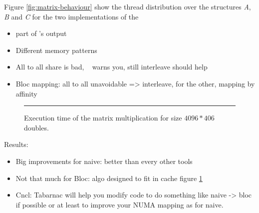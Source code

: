 Figure \ref{fig:matrix-behaviour} show the thread distribution over the
structures \emph{A}, \emph{B} and \emph{C} for the two implementations of the
\begin{itemize}
    \item part of \TABARNAC's output
    \item Different memory patterns
    \item All to all share is bad, \TABARNAC~ warns you, still interleave
        should help
    \item Bloc mapping: all to all unavoidable => interleave, for the other,
        mapping by affinity
\end{itemize}

\begin{figure}[htb]
    \centering
    \rule{4cm}{4cm}
    \caption{Execution time of the matrix multiplication for size $4096*406$ doubles.}
    \label{fig:matrix-res}
\end{figure}

Results:
\begin{itemize}
    \item Big improvements for naive: better than every other tools
    \item Not that much for Bloc: algo designed to fit in cache figure
        \ref{fig:matrix-res}
    \item Cncl: Tabarnac will help you modify code to do something like naive
        -> bloc if possible or at least to improve your NUMA mapping as for
        naive.
\end{itemize}

